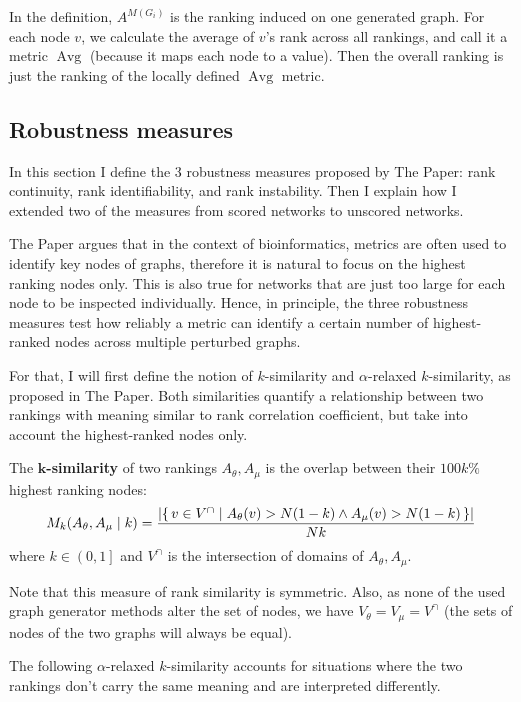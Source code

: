 In the definition, $A^{M(G_i)}$ is the ranking induced on one generated graph.
For each node $v$, we calculate the average of $v$'s rank across all rankings, and call it a metric $\operatorname{Avg}$ (because it maps each node to a value).
Then the overall ranking is just the ranking of the locally defined $\operatorname{Avg}$ metric.

\subsection{Robustness measures}\label{sec:robustness_measures}

In this section I define the 3 robustness measures proposed by The Paper: rank continuity, rank identifiability, and rank instability.
Then I explain how I extended two of the measures from scored networks to unscored networks.

The Paper argues that in the context of bioinformatics, metrics are often used to identify key nodes of graphs, therefore it is natural to focus on the highest ranking nodes only.
This is also true for networks that are just too large for each node to be inspected individually\citeneeded.
Hence, in principle, the three robustness measures test how reliably a metric can identify a certain number of highest-ranked nodes across multiple perturbed graphs.


For that, I will first define the notion of $k$-similarity and $\alpha$-relaxed $k$-similarity, as proposed in The Paper.
Both similarities quantify a relationship between two rankings with meaning similar to rank correlation coefficient, but take into account the highest-ranked nodes only.

\begin{definition}[$\bm{k}$-similarity]
    The \textbf{$\bm{k}$-similarity} of two rankings $A_\theta, A_\mu$ is the overlap between their $100k\%$ highest ranking nodes:
    \[ M_k(A_\theta, A_\mu \mid k) = \frac{\left\lvert \left\{\, v \in V^{\cap} \mid  A_\theta(v) > N(1-k) \wedge A_\mu(v) > N(1-k)  \, \right\} \right\rvert}{Nk} \]
    where $k \in \left( 0, 1 \right]$ and $V^{\cap}$ is the intersection of domains of $A_\theta, A_\mu$.
\end{definition}

Note that this measure of rank similarity is symmetric.
Also, as none of the used graph generator methods alter the set of nodes, we have $V_\theta = V_\mu = V^{\cap}$ (the sets of nodes of the two graphs will always be equal).

The following $\alpha$-relaxed $k$-similarity accounts for situations where the two rankings don't carry the same meaning and are interpreted differently.

